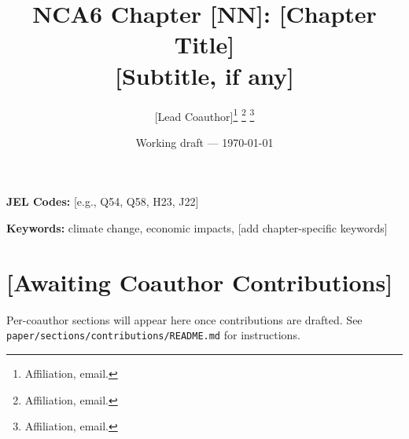 \documentclass[12pt]{article}
\title{NCA6 Chapter [NN]: [Chapter Title] \\
       \large [Subtitle, if any]}
\author{
  [Lead Coauthor]\thanks{Affiliation, email.} \quad
  [Coauthor 2]\thanks{Affiliation, email.} \quad
  [Coauthor 3]\thanks{Affiliation, email.}
}
\date{Working draft — \today}
\begin{document}
\maketitle
\thispagestyle{empty}

\begin{abstract}
\noindent {}
\end{abstract}

\vspace{1em}
\noindent \textbf{JEL Codes:} [e.g., Q54, Q58, H23, J22]

\vspace{0.5em}
\noindent \textbf{Keywords:} climate change, economic impacts, [add chapter-specific keywords]

\newpage
\setcounter{page}{1}



%
%
% 
% 
% 
% 

\section*{[Awaiting Coauthor Contributions]}
Per-coauthor sections will appear here once contributions are drafted. See
\texttt{paper/sections/contributions/README.md} for instructions.

\clearpage
\small \printbibliography
\end{document}
